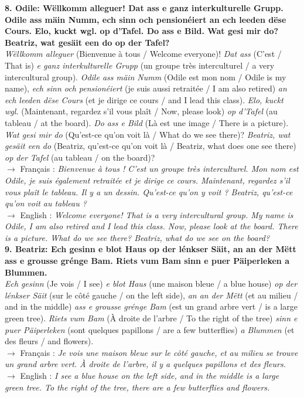 \noindent\textbf{8. Odile: Wëllkomm alleguer! Dat ass e ganz interkulturelle Grupp. Odile ass mäin Numm, ech sinn och pensionéiert an ech leeden dëse Cours. Elo, kuckt wgl. op d'Tafel. Do ass e Bild. Wat gesi mir do? Beatriz, wat gesäit een do op der Tafel?}\\
\textit{Wëllkomm alleguer} (Bienvenue à tous / Welcome everyone)! \textit{Dat ass} (C'est / That is) \textit{e ganz interkulturelle Grupp} (un groupe très interculturel / a very intercultural group). \textit{Odile ass mäin Numm} (Odile est mon nom / Odile is my name), \textit{ech sinn och pensionéiert} (je suis aussi retraitée / I am also retired) \textit{an ech leeden dëse Cours} (et je dirige ce cours / and I lead this class). \textit{Elo, kuckt wgl.} (Maintenant, regardez s'il vous plaît / Now, please look) \textit{op d'Tafel} (au tableau / at the board). \textit{Do ass e Bild} (Là est une image / There is a picture). \textit{Wat gesi mir do} (Qu'est-ce qu'on voit là / What do we see there)? \textit{Beatriz, wat gesäit een do} (Beatriz, qu'est-ce qu'on voit là / Beatriz, what does one see there) \textit{op der Tafel} (au tableau / on the board)?\\
$\rightarrow$ Français : \textit{Bienvenue à tous ! C'est un groupe très interculturel. Mon nom est Odile, je suis également retraitée et je dirige ce cours. Maintenant, regardez s'il vous plaît le tableau. Il y a un dessin. Qu'est-ce qu'on y voit ? Beatriz, qu'est-ce qu'on voit au tableau ?}\\
$\rightarrow$ English : \textit{Welcome everyone! That is a very intercultural group. My name is Odile, I am also retired and I lead this class. Now, please look at the board. There is a picture. What do we see there? Beatriz, what do we see on the board?}\\[0.5em]

\noindent\textbf{9. Beatriz: Ech gesinn e blot Haus op der lénkser Säit, an an der Mëtt ass e grousse grénge Bam. Riets vum Bam sinn e puer Päiperleken a Blummen.}\\
\textit{Ech gesinn} (Je vois / I see) \textit{e blot Haus} (une maison bleue / a blue house) \textit{op der lénkser Säit} (sur le côté gauche / on the left side), \textit{an an der Mëtt} (et au milieu / and in the middle) \textit{ass e grousse grénge Bam} (est un grand arbre vert / is a large green tree). \textit{Riets vum Bam} (À droite de l'arbre / To the right of the tree) \textit{sinn e puer Päiperleken} (sont quelques papillons / are a few butterflies) \textit{a Blummen} (et des fleurs / and flowers).\\
$\rightarrow$ Français : \textit{Je vois une maison bleue sur le côté gauche, et au milieu se trouve un grand arbre vert. À droite de l'arbre, il y a quelques papillons et des fleurs.}\\
$\rightarrow$ English : \textit{I see a blue house on the left side, and in the middle is a large green tree. To the right of the tree, there are a few butterflies and flowers.}\\[0.5em]

